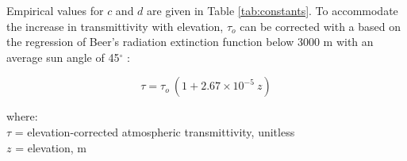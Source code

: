 \noindent Empirical values for $c$ and $d$ are given in Table \ref{tab:constants}. 
To accommodate the increase in transmittivity with elevation, $\tau_o$ can be corrected with a based on the regression of Beer's radiation extinction function below 3000 m with an average sun angle of 45$^{\circ}$ \parencite{allen96}:

\begin{equation}
\label{eq:tau}
	\tau = \tau_o\:\left( 1+2.67\times 10^{-5}\: z \right)
\end{equation}

\noindent where: \\
\indent $\tau$ = elevation-corrected atmospheric transmittivity, unitless \\
\indent $z$ = elevation, m \\

